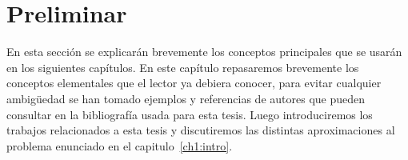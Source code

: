 % 
% 
% 
% 
\chapter[Preliminar]{Preliminar}\label{ch:preliminar}

En esta sección se explicarán brevemente los conceptos principales que se usarán en los siguientes capítulos.
En este capítulo repasaremos brevemente los conceptos elementales que el lector ya debiera conocer, para evitar cualquier ambigüedad se han tomado ejemplos y referencias de autores que pueden consultar en la bibliografía usada para esta tesis. Luego introduciremos los trabajos relacionados a esta tesis y discutiremos las distintas aproximaciones al problema enunciado en el capitulo~\ref{ch1:intro}.

 


